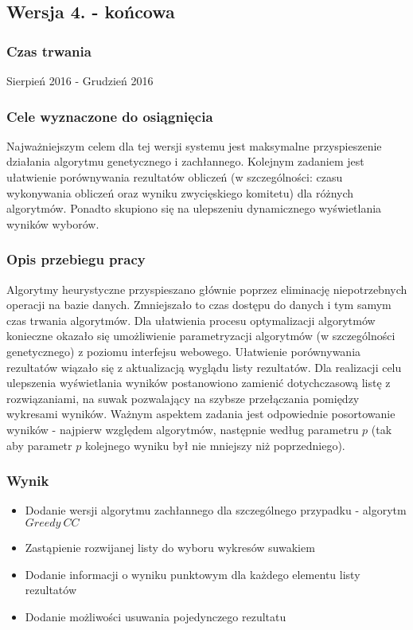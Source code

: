 \documentclass[pdflatex,11pt]{../aghdoc_version2}
\begin{document}
\subsection{Wersja 4. - końcowa}
\subsubsection{Czas trwania}
Sierpień 2016 - Grudzień 2016
\subsubsection{Cele wyznaczone do osiągnięcia}
Najważniejszym celem dla tej wersji systemu jest maksymalne przyspieszenie działania
algorytmu genetycznego i zachłannego.
Kolejnym zadaniem jest ułatwienie porównywania rezultatów obliczeń (w szczególności:
czasu wykonywania obliczeń oraz wyniku zwycięskiego komitetu) dla różnych algorytmów.
Ponadto skupiono się na ulepszeniu dynamicznego wyświetlania wyników wyborów.
\subsubsection{Opis przebiegu pracy}
Algorytmy heurystyczne przyspieszano głównie poprzez eliminację niepotrzebnych operacji
na bazie danych. Zmniejszało to czas dostępu do danych i tym samym czas trwania
algorytmów. Dla ułatwienia procesu optymalizacji algorytmów konieczne okazało się
umożliwienie parametryzacji algorytmów (w szczególności genetycznego) z poziomu
interfejsu webowego. Ułatwienie porównywania rezultatów wiązało się z aktualizacją
wyglądu listy rezultatów. Dla realizacji celu ulepszenia wyświetlania wyników postanowiono
zamienić dotychczasową listę z rozwiązaniami, na suwak pozwalający na szybsze
przełączania pomiędzy wykresami wyników. Ważnym aspektem zadania jest odpowiednie
posortowanie wyników - najpierw względem algorytmów, następnie według parametru $p$ (tak
aby parametr $p$ kolejnego wyniku był nie mniejszy niż poprzedniego).
\subsubsection{Wynik}
\begin{itemize}
\item Dodanie wersji algorytmu zachłannego dla szczególnego przypadku - algorytm $Greedy \ CC$
\item Zastąpienie rozwijanej listy do wyboru wykresów suwakiem
\item Dodanie informacji o wyniku punktowym dla każdego elementu listy rezultatów
\item Dodanie możliwości usuwania pojedynczego rezultatu
\end{itemize}
\end{document}

